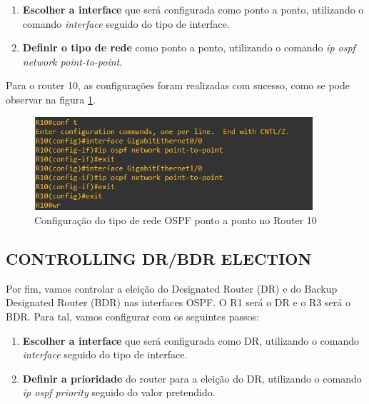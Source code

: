 \documentclass[11pt,english, openright, oneside]{book}
\begin{document}
\begin{enumerate}
  \item \textbf{Escolher a interface} que será configurada como ponto a ponto, utilizando o comando \textit{interface} seguido do tipo de interface.
  \item \textbf{Definir o tipo de rede} como ponto a ponto, utilizando o comando \textit{ip ospf network point-to-point}.
\end{enumerate}
\vspace{0.2cm}

Para o router 10, as configurações foram realizadas com sucesso, como se pode observar na figura \ref{fig:config8}.
\vspace{0.2cm}

\begin{figure}[H]
    \centering
    \includegraphics[width=0.92\textwidth]{imagens/Tarefa2/7.ospf_network_types.png}
    \caption{Configuração do tipo de rede OSPF ponto a ponto no Router 10}
    \label{fig:config8}
\end{figure}
\vspace{0.2cm}

\newpage
\subsection{CONTROLLING DR/BDR ELECTION}
\vspace{0.2cm}

Por fim, vamos controlar a eleição do Designated Router (DR) e do Backup Designated Router (BDR) nas interfaces OSPF. O R1 será o DR e o R3 será o BDR. Para tal, vamos configurar com os seguintes passos:
\vspace{0.2cm}

\begin{enumerate}
  \item \textbf{Escolher a interface} que será configurada como DR, utilizando o comando \textit{interface} seguido do tipo de interface.
  \item \textbf{Definir a prioridade} do router para a eleição do DR, utilizando o comando \textit{ip ospf priority} seguido do valor pretendido.
\end{enumerate}
\vspace{0.2cm}
\end{document}
